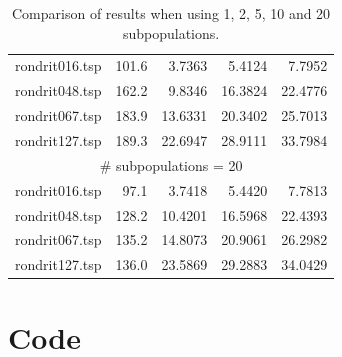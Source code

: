 \documentclass{report}
\begin{document}
\begin{table}[H]
{\begin{tabular}{l rrrr}
			\midrule
			rondrit016.tsp & 101.6 & 3.7363 & 5.4124 & 7.7952 \\
			rondrit048.tsp & 162.2 & 9.8346 & 16.3824 & 22.4776 \\
			rondrit067.tsp & 183.9 & 13.6331 & 20.3402 & 25.7013 \\
			rondrit127.tsp & 189.3 & 22.6947 & 28.9111 & 33.7984 \\
			\midrule
			\multicolumn{5}{c}{\# subpopulations = 20}\\ 
			\midrule
			rondrit016.tsp & 97.1 & 3.7418 & 5.4420 & 7.7813 \\
			rondrit048.tsp & 128.2 & 10.4201 & 16.5968 & 22.4393 \\
			rondrit067.tsp & 135.2 & 14.8073 & 20.9061 & 26.2982 \\
			rondrit127.tsp & 136.0 & 23.5869 & 29.2883 & 34.0429 \\
			\bottomrule
		\end{tabular}
	}
	\caption{Comparison of results when using 1, 2, 5, 10 and 20 subpopulations.}
	\label{tab:diversity}
\end{table}

\section{Code}








 
\end{document}
